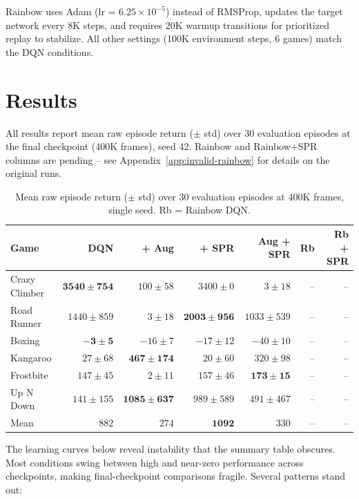 \documentclass[11pt]{article}
\begin{document}
\noindent Rainbow uses Adam (lr = $6.25 \times 10^{-5}$) instead of
RMSProp, updates the target network every 8K steps, and requires 20K
warmup transitions for prioritized replay to stabilize. All other
settings (100K environment steps, 6 games) match the DQN conditions.

\section{Results}

All results report mean raw episode return ($\pm$ std) over 30
evaluation episodes at the final checkpoint (400K frames), seed 42.
Rainbow and Rainbow+SPR columns are pending -- see
Appendix~\ref{app:invalid-rainbow} for details on the original runs.

\begin{table}[H]
\centering
\small
\renewcommand{\arraystretch}{1.7}
\setlength{\tabcolsep}{7pt}
\begin{tabular}{l rrrr rr}
\toprule
\textbf{Game}
  & \textbf{DQN}
  & \textbf{+ Aug}
  & \textbf{+ SPR}
  & \textbf{Aug + SPR}
  & \textbf{Rb}
  & \textbf{Rb + SPR} \\
\midrule
Crazy Climber  & $\mathbf{3540 \pm 754}$  & $100 \pm 58$    & $3400 \pm 0$     & $3 \pm 18$      & --  & -- \\
Road Runner    & $1440 \pm 859$  & $3 \pm 18$      & $\mathbf{2003 \pm 956}$   & $1033 \pm 539$  & --  & -- \\
Boxing         & $\mathbf{-3 \pm 5}$      & $-16 \pm 7$     & $-17 \pm 12$     & $-40 \pm 10$    & --  & -- \\
Kangaroo       & $27 \pm 68$     & $\mathbf{467 \pm 174}$   & $20 \pm 60$      & $320 \pm 98$    & --  & -- \\
Frostbite      & $147 \pm 45$    & $2 \pm 11$      & $157 \pm 46$     & $\mathbf{173 \pm 15}$    & --  & -- \\
Up N Down      & $141 \pm 155$   & $\mathbf{1085 \pm 637}$  & $989 \pm 589$    & $491 \pm 467$   & --  & -- \\
\midrule
Mean           & $882$  & $274$  & $\mathbf{1092}$  & $330$  & --  & -- \\
\bottomrule
\end{tabular}
\caption{Mean raw episode return ($\pm$ std) over 30 evaluation
episodes at 400K frames, single seed. Rb = Rainbow DQN.}
\label{tab:summary}
\end{table}

\noindent The learning curves below reveal instability that the summary
table obscures. Most conditions swing between high and near-zero
performance across checkpoints, making final-checkpoint comparisons
fragile. Several patterns stand out:
\end{document}
